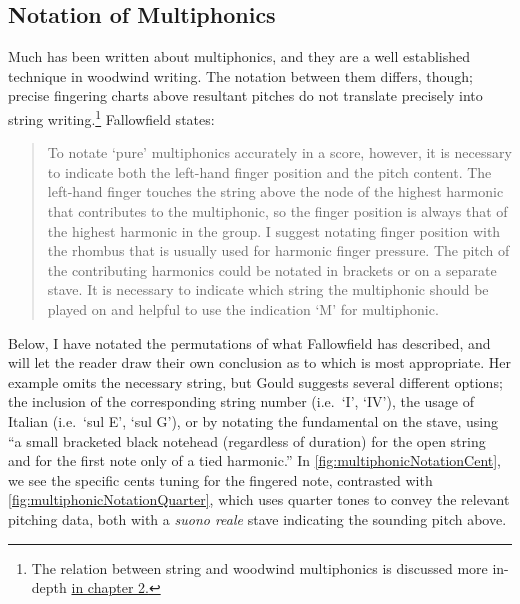\subsection{Notation of Multiphonics}\label{sec:notation-multiphonics}
Much has been written about multiphonics, and they are a well established technique in woodwind writing.
The notation between them differs, though; precise fingering charts above resultant pitches do not translate precisely into string writing.\footnote{The relation between string and woodwind multiphonics is discussed more in-depth \hyperref[sec:multiphonicsWoodwind]{in chapter 2.}}
Fallowfield states: \begin{quotation}
    To notate ‘pure’ multiphonics accurately in a score, however, it is necessary to indicate both the left-hand finger position and the pitch content. 
    The left-hand finger touches the string above the node of the highest harmonic that contributes to the multiphonic, so the finger position is always that of the highest harmonic in the group. 
    I suggest notating finger position with the rhombus that is usually used for harmonic finger pressure. 
    The pitch of the contributing harmonics could be notated in brackets or on a separate stave.
    It is necessary to indicate which string the multiphonic should be played on and helpful to use the indication ‘M’ for multiphonic.\autocite[http://www.cellomap.com/index/the-string/multiphonics-and-other-multiple-sounds.html]{fallowfieldCelloMap}
\end{quotation}
Below, I have notated the permutations of what Fallowfield has described, and will let the reader draw their own conclusion as to which is most appropriate.
Her example omits the necessary string, but Gould suggests several different options; the inclusion of the corresponding string number (i.e.\ `I', `IV'), the usage of Italian (i.e.\ `sul E', `sul G'), or by notating the fundamental on the stave, using ``a small bracketed black notehead (regardless of duration) for the open string and for the first note only of a tied harmonic.''\autocite[418]{gouldBars2011}
In \autoref{fig:multiphonicNotationCent}, we see the specific cents tuning for the fingered note, contrasted with \autoref{fig:multiphonicNotationQuarter}, which uses quarter tones to convey the relevant pitching data, both with a \emph{suono reale} stave indicating the sounding pitch above.

